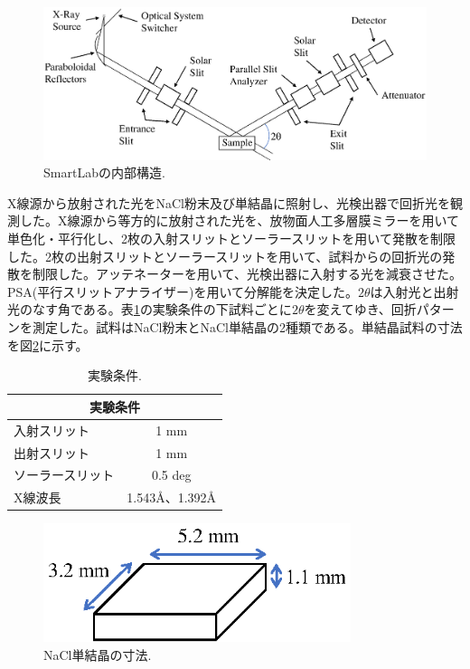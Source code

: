 \documentclass[11pt,a4j,uplatex]{jsarticle}
\begin{document}
\begin{figure}[htb]
 \centering
 \includegraphics[clip,width=12cm]{XRD.eps}
 \caption{SmartLabの内部構造.}
 \label{smartlab}
\end{figure}

X線源から放射された光をNaCl粉末及び単結晶に照射し、光検出器で回折光を観測した。X線源から等方的に放射された光を、放物面人工多層膜ミラーを用いて単色化・平行化し、2枚の入射スリットとソーラースリットを用いて発散を制限した。2枚の出射スリットとソーラースリットを用いて、試料からの回折光の発散を制限した。アッテネーターを用いて、光検出器に入射する光を減衰させた。PSA(平行スリットアナライザー)を用いて分解能を決定した。$2\theta$は入射光と出射光のなす角である。表\ref{exp}の実験条件の下試料ごとに$2\theta$を変えてゆき、回折パターンを測定した。試料はNaCl粉末とNaCl単結晶の2種類である。単結晶試料の寸法を図\ref{size}に示す。

\begin{table}[ht]
 \centering
 \caption{実験条件.}
 \begin{tabular}{lc}\hline
  \multicolumn{2}{c}{実験条件}          \\ \hline
  入射スリット     & 1 mm               \\
  出射スリット     & 1 mm               \\
  ソーラースリット & 0.5 deg            \\
  X線波長          & 1.543\AA、1.392\AA \\\hline
 \end{tabular}
 \label{exp}
\end{table}

\begin{figure}[htb]
 \centering
 \includegraphics[clip,width=9cm]{bulk.eps}
 \caption{NaCl単結晶の寸法.}
 \label{size}
\end{figure}
\end{document}
